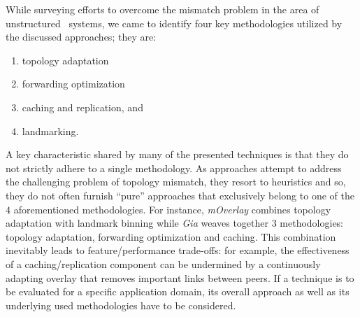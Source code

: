 %
%
%

While surveying efforts to overcome the mismatch problem
in the area of unstructured \p\ systems,
we came to identify four key methodologies 
utilized by the discussed approaches; they are:
\begin{enumerate}
  \item topology adaptation
  \item forwarding optimization
  \item caching and replication, and
  \item landmarking.
\end{enumerate}
%
A key characteristic shared by many of the presented techniques 
is that they do not strictly adhere to a single methodology.
As approaches attempt to address the challenging problem 
of topology mismatch, they resort to heuristics and so, 
they do not often furnish ``pure'' approaches that exclusively
belong to one of the $4$ aforementioned methodologies.
For instance, \emph{mOverlay} combines topology adaptation 
with landmark binning 
while \emph{Gia} weaves together $3$ methodologies:  topology adaptation, 
forwarding optimization and caching. 
This combination inevitably leads to feature/performance trade-offs: for example, 
the effectiveness of a caching/replication component can be undermined
by a continuously adapting overlay that removes important links between peers.
If a technique is to be evaluated for a specific application domain,
its overall approach as well as its underlying used methodologies have to be considered.

